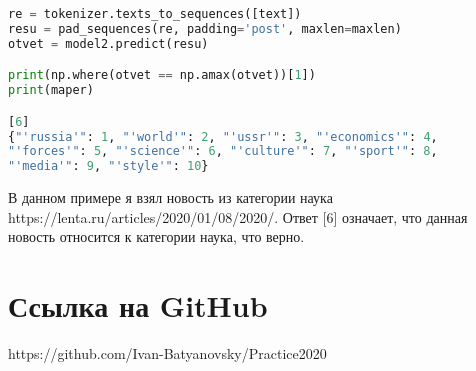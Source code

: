 \begin{lstlisting}[language=Python]
re = tokenizer.texts_to_sequences([text])
resu = pad_sequences(re, padding='post', maxlen=maxlen)
otvet = model2.predict(resu)

print(np.where(otvet == np.amax(otvet))[1])
print(maper)

[6]
{"'russia'": 1, "'world'": 2, "'ussr'": 3, "'economics'": 4,
"'forces'": 5, "'science'": 6, "'culture'": 7, "'sport'": 8,
"'media'": 9, "'style'": 10}
\end{lstlisting}

В данном примере я взял новость из категории наука  https://lenta.ru/articles/2020/01/08/2020/. Ответ [6] означает, что данная новость относится к категории наука, что верно. 

\section*{Ссылка на GitHub}

https://github.com/Ivan-Batyanovsky/Practice2020

\pagebreak
